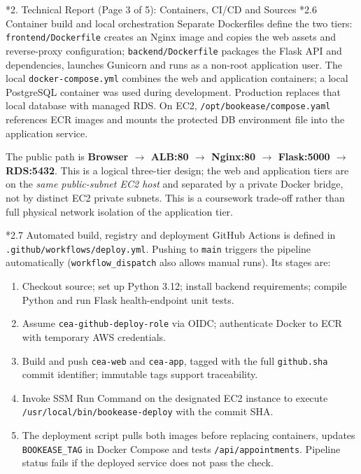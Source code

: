 \documentclass[10pt,a4paper]{article}
\makeatletter
\renewcommand{\section}{\@startsection{section}{1}{0pt}{11pt}{5pt}{\normalfont\large\bfseries\color{navy}}}
\renewcommand{\subsection}{\@startsection{subsection}{2}{0pt}{7pt}{3pt}{\normalfont\normalsize\bfseries\color{navy}}}
\makeatother
\begin{document}
\section*{2. Technical Report (Page 3 of 5): Containers, CI/CD and Sources}
\subsection*{2.6 Container build and local orchestration}
Separate Dockerfiles define the two tiers: \texttt{frontend/Dockerfile} creates an Nginx image and copies the web assets and reverse-proxy configuration; \texttt{backend/Dockerfile} packages the Flask API and dependencies, launches Gunicorn and runs as a non-root application user. The local \texttt{docker-compose.yml} combines the web and application containers; a local PostgreSQL container was used during development. Production replaces that local database with managed RDS. On EC2, \texttt{/opt/bookease/compose.yaml} references ECR images and mounts the protected DB environment file into the application service.

The public path is \textbf{Browser $\rightarrow$ ALB:80 $\rightarrow$ Nginx:80 $\rightarrow$ Flask:5000 $\rightarrow$ RDS:5432}. This is a logical three-tier design; the web and application tiers are on the \emph{same public-subnet EC2 host} and separated by a private Docker bridge, not by distinct EC2 private subnets. This is a coursework trade-off rather than full physical network isolation of the application tier.

\subsection*{2.7 Automated build, registry and deployment}
GitHub Actions is defined in \texttt{.github/workflows/deploy.yml}. Pushing to \texttt{main} triggers the pipeline automatically (\texttt{workflow\_dispatch} also allows manual runs). Its stages are:
\begin{enumerate}
\item Checkout source; set up Python 3.12; install backend requirements; compile Python and run Flask health-endpoint unit tests.
\item Assume \texttt{cea-github-deploy-role} via OIDC; authenticate Docker to ECR with temporary AWS credentials.
\item Build and push \texttt{cea-web} and \texttt{cea-app}, tagged with the full \texttt{github.sha} commit identifier; immutable tags support traceability.
\item Invoke SSM Run Command on the designated EC2 instance to execute \texttt{/usr/local/bin/bookease-deploy} with the commit SHA.
\item The deployment script pulls both images before replacing containers, updates \texttt{BOOKEASE\_TAG} in Docker Compose and tests \texttt{/api/appointments}. Pipeline status fails if the deployed service does not pass the check.
\end{enumerate}
\end{document}
